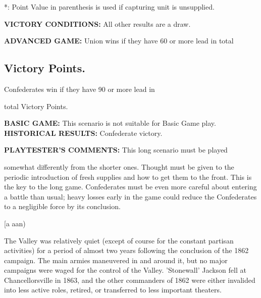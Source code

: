 *: Point Value in parenthesis is used if capturing unit is unsupplied.

\begin{scenariodata}
\textbf{VICTORY CONDITIONS:} All other results are a draw.\\
\end{scenariodata}

\begin{scenariodata}
\textbf{ADVANCED GAME:} Union wins if they have 60 or more lead in total\\
\end{scenariodata}

\subsection*{Victory Points.}

\begin{scenariodata}
Confederates win if they have 90 or more lead in\\
\end{scenariodata}

total Victory Points.

\begin{scenariodata}
\textbf{BASIC GAME:} This scenario is not suitable for Basic Game play.\\
\textbf{HISTORICAL RESULTS:} Confederate victory.\\
\end{scenariodata}

\begin{scenariodata}
\textbf{PLAYTESTER'S COMMENTS:} This long scenario must be played\\
\end{scenariodata}

somewhat differently from the shorter ones. Thought must be given to the periodic introduction of fresh supplies and how to get them to the front. This is the key to the long game. Confederates must be even more careful about entering a battle than usual; heavy losses early in the game could reduce the Confederates to a negligible force by its conclusion.

[a aan)

The Valley was relatively quiet (except of course for the constant partisan activities) for a period of almost two years following the conclusion of the 1862 campaign. The main armies maneuvered in and around it, but no major campaigns were waged for the control of the Valley. 'Stonewall' Jackson fell at Chancellorsville in 1863, and the other commanders of 1862 were either invalided into less active roles, retired, or transferred to less important theaters.

